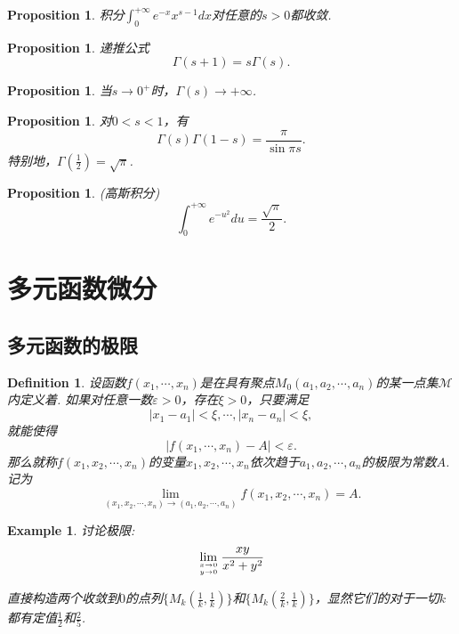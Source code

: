 \documentclass{article}
\newtheorem{proposition}[theorem]{Proposition}
\newtheorem{example}[theorem]{Example}
\newtheorem{definition}[theorem]{Definition}
\begin{document}
\begin{proposition}
\rm 积分$\int_0^{+\infty} e^{-x}x^{s-1}dx$对任意的$s > 0$都收敛.
\end{proposition}

\begin{proposition}
\rm 递推公式
$$
\Gamma(s+1) = s\Gamma(s). 
$$
\end{proposition}

\begin{proposition}
\rm 当$s \rightarrow 0^+$时，$\Gamma(s) \rightarrow +\infty$.
\end{proposition}

\begin{proposition}
\rm 对$0<s<1$，有
$$
\Gamma(s)\Gamma(1-s) = \frac{\pi}{\sin \pi s}. 
$$
特别地，$\Gamma(\frac{1}{2})=\sqrt{\pi}$.
\end{proposition}

\begin{proposition}
\rm {\color{red} (高斯积分)}
$$
\int_0^{+\infty} e^{-u^2} du = \frac{\sqrt{\pi}}{2}.
$$
\end{proposition}

\section{多元函数微分}

\subsection{多元函数的极限}

\begin{definition}
\rm 设函数$f(x_1,\cdots,x_n)$是在具有聚点$M_0(a_1,a_2,\cdots,a_n)$的某一点集$\mathcal{M}$内定义着. 如果对任意一数$\varepsilon > 0$，存在$\xi > 0$，只要满足
$$
|x_1 - a_1| < \xi,\cdots,|x_n - a_n| < \xi,
$$
就能使得
$$
|f(x_1,\cdots,x_n) - A| < \varepsilon. 
$$
那么就称$f(x_1,x_2,\cdots,x_n)$的变量$x_1,x_2,\cdots,x_n$依次趋于$a_1,a_2,\cdots,a_n$的极限为常数$A$. 记为
$$
\lim\limits_{(x_1,x_2,\cdots,x_n) \to (a_1,a_2,\cdots,a_n)}f(x_1,x_2,\cdots,x_n) = A.
$$
\end{definition}

\begin{example}
\rm 讨论极限:
$$
\lim\limits_{x \rightarrow 0 \atop y \rightarrow 0 } \frac{xy}{x^2+y^2}
$$

直接构造两个收敛到$0$的点列$\{M_k(\frac{1}{k}, \frac{1}{k})\}$和$\{M_k(\frac{2}{k}, \frac{1}{k})\}$，显然它们的对于一切$k$都有定值$\frac{1}{2}$和$\frac{2}{5}$.
\end{example}
\end{document}
